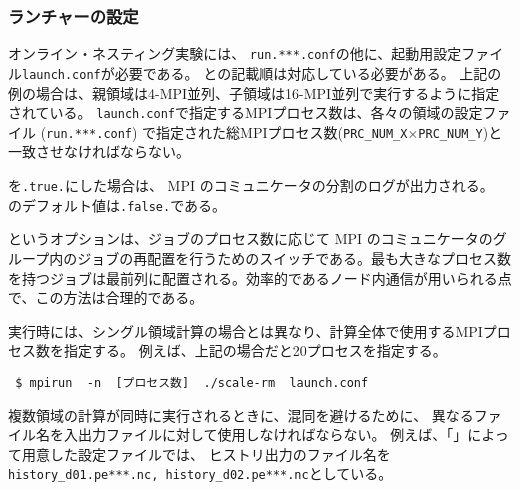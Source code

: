 \subsubsection{ランチャーの設定}
\label{subsubsec:launch}
オンライン・ネスティング実験には、
\verb|run.***.conf|の他に、起動用設定ファイル\verb|launch.conf|が必要である。
との記載順は対応している必要がある。
上記の例の場合は、親領域は4-MPI並列、子領域は16-MPI並列で実行するように指定されている。
\verb|launch.conf|で指定するMPIプロセス数は、各々の領域の設定ファイル (\verb|run.***.conf|)
で指定された総MPIプロセス数(\verb|PRC_NUM_X|$\times$\verb|PRC_NUM_Y|)と一致させなければならない。


を\verb|.true.|にした場合は、
MPI のコミュニケータの分割のログが出力される。
のデフォルト値は\verb|.false.|である。

というオプションは、ジョブのプロセス数に応じて MPI のコミュニケータのグループ内のジョブの再配置を行うためのスイッチである。最も大きなプロセス数を持つジョブは最前列に配置される。効率的であるノード内通信が用いられる点で、この方法は合理的である。


実行時には、シングル領域計算の場合とは異なり、計算全体で使用するMPIプロセス数を指定する。
例えば、上記の場合だと20プロセスを指定する。
\begin{verbatim}
 $ mpirun  -n  [プロセス数]  ./scale-rm  launch.conf
\end{verbatim}

複数領域の計算が同時に実行されるときに、混同を避けるために、
異なるファイル名を入出力ファイルに対して使用しなければならない。
例えば、「\makeconftool」によって用意した設定ファイルでは、
ヒストリ出力のファイル名を\verb|history_d01.pe***.nc, history_d02.pe***.nc|としている。

